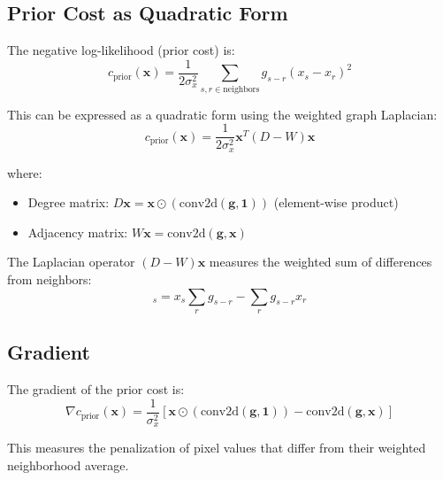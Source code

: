 \documentclass[12pt]{article}
\begin{document}
\subsection*{Prior Cost as Quadratic Form}

The negative log-likelihood (prior cost) is:
\begin{equation*}
c_{\text{prior}}(\mathbf{x}) = \frac{1}{2\sigma_x^2} \sum_{s,r \in \text{neighbors}} g_{s-r}(x_s - x_r)^2
\end{equation*}

This can be expressed as a quadratic form using the weighted graph Laplacian:
\begin{equation*}
c_{\text{prior}}(\mathbf{x}) = \frac{1}{2\sigma_x^2} \mathbf{x}^T (D - W) \mathbf{x}
\end{equation*}

where:
\begin{itemize}
    \item Degree matrix: $D\mathbf{x} = \mathbf{x} \odot (\text{conv2d}(\mathbf{g}, \mathbf{1}))$ (element-wise product)
    \item Adjacency matrix: $W\mathbf{x} = \text{conv2d}(\mathbf{g}, \mathbf{x})$
\end{itemize}

The Laplacian operator $(D - W)\mathbf{x}$ measures the weighted sum of differences from neighbors:
\begin{equation*}
[(D-W)\mathbf{x}]_s = x_s \sum_r g_{s-r} - \sum_r g_{s-r} x_r
\end{equation*}

\subsection*{Gradient}

The gradient of the prior cost is:
\begin{equation*}
\nabla c_{\text{prior}}(\mathbf{x}) = \frac{1}{\sigma_x^2} \left[ \mathbf{x} \odot (\text{conv2d}(\mathbf{g}, \mathbf{1})) - \text{conv2d}(\mathbf{g}, \mathbf{x}) \right]
\end{equation*}

This measures the penalization of pixel values that differ from their weighted neighborhood average.
\end{document}
